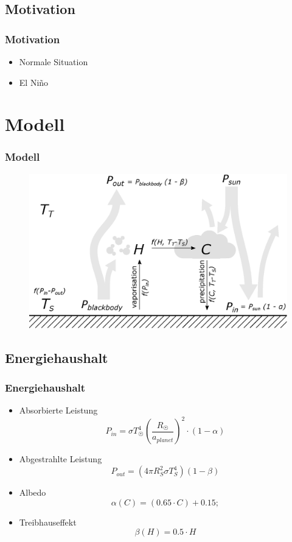 \documentclass{beamer}
\begin{document}
\subsection{Motivation}
\begin{frame}
	\frametitle{Motivation}
	\begin{itemize}
		\item[] Normale Situation
	
		\pause
		\item[] El Niño
	
	\end{itemize}
\end{frame}


\section{Modell} 
\begin{frame}
	\frametitle{Modell}
	\begin{figure}
		\includegraphics[width=\linewidth]{Pictures/Model.eps}
	\end{figure}
\end{frame}

\subsection{Energiehaushalt}
\begin{frame}
\frametitle{Energiehaushalt}
\begin{itemize}
	\item[] Absorbierte Leistung
	\begin{equation}
	P_{in} = \sigma T_{\astrosun}^4 \left( \frac{R_{\astrosun}}{a_{planet}} \right) ^2 \cdot (1-\alpha)
	\end{equation} 
	\item[] Abgestrahlte Leistung
	\begin{equation}
	P_{out} = (4 \pi R_{S}^2 \sigma T_{S}^4)(1 - \beta)
	\end{equation}
	\pause
	\item[] Albedo
	\begin{equation}
	\alpha(C) = (0.65 \cdot C) + 0.15;
	\end{equation}
	\pause
	\item[] Treibhauseffekt
	\begin{equation}
	\beta(H) = 0.5 \cdot H
	\end{equation}
\end{itemize}
\end{frame}
\end{document}
